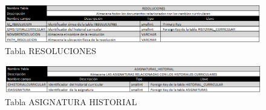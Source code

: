  	\begin{figure}[H]
 		\centering
 		\includegraphics[width=1\textwidth]{images/Anexos/TABLA_RESOLUCIONES.png}
 		\caption[Tabla RESOLUCIONES ]{Tabla RESOLUCIONES}
 		\label{TABLA_RESOLUCIONES}
 	\end{figure}
 	
 	\begin{figure}[H]
 		\centering
 		\includegraphics[width=1\textwidth]{images/Anexos/TABLA_ASIGNATURA_HISTORIAL.png}
 		\caption[Tabla ASIGNATURA HISTORIAL  ]{Tabla ASIGNATURA HISTORIAL }
 		\label{TABLA_ASIGNATURA_HISTORIAL}
 	\end{figure}